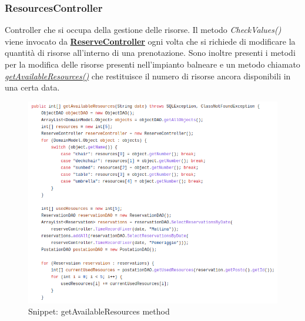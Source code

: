 \documentclass{article}
\begin{document}
{\subsubsection{ResourcesController}\label{subsubsec:resourcescontroller}
Controller che si occupa della gestione delle risorse. Il metodo \textit{CheckValues()} viene invocato da \hyperref[subsubsec:reservecontroller]{\textbf{ReserveController}} ogni volta che si richiede di modificare la quantità di risorse all'interno di una prenotazione. Sono inoltre presenti i metodi per la modifica delle risorse presenti nell'impianto balneare e un metodo chiamato \hyperref[fig:getavailableresources]{\textit{getAvailableResources()}} che restituisce il numero di risorse ancora disponibili in una certa data.
\begin{figure}[H]
                \centering
                \includegraphics[width=\textwidth]{Images/Snippets/GetAvailableResources.png}
                \caption{Snippet: getAvailableResources method}
                \label{fig:getavailableresources}
            \end{figure}
}
\end{document}
